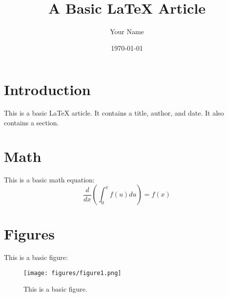 \documentclass[12pt]{article}
\title{A Basic \LaTeX{} Article}
\author{Your Name}
\date{\today}
\begin{document}
\maketitle

\section{Introduction}
This is a basic \LaTeX{} article.  It contains a title, author, and date.  It also contains a section.

\section{Math}
This is a basic math equation:
\begin{equation}
    \label{eq:1}
    \frac{d}{dx} \left( \int_{0}^{x} f(u) du \right) = f(x)

\end{equation}

\section{Figures}
This is a basic figure:
\begin{figure}[h]
    \centering
    \texttt{[image: figures/figure1.png]}
    \caption{This is a basic figure.}
    \label{fig:1}

\end{figure}
\end{document}
